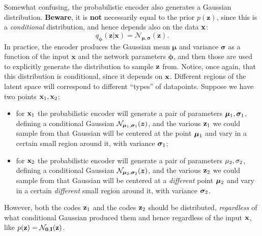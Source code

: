 Somewhat confusing, the probabilistic encoder also generates a Gaussian distribution. \textbf{Beware}, it is \textbf{not} necessarily equal to the prior $p(\mathbf{z})$, since this is a \emph{conditional} distribution, and hence depends also on the data $\vb{x}$:
\begin{equation}\label{eq:small_gauss}
	q_\mathbf{\phi}(\mathbf{z} | \mathbf{x}) = \mathcal{N}_{\mathbf{\mu}, \mathbf{\sigma}}(\mathbf{z}).
\end{equation}
In practice, the encoder produces the Gaussian mean $\mathbf{\mu}$ and variance $\mathbf{\sigma}$ as a function of the input $\mathbf{x}$ and the network parameters $\mathbf{\phi}$, and then those are used to explicitly generate the distribution to sample $\vb{z}$ from. Notice, once again, that this distribution is conditional, since it depends on $\vb{x}$. Different regions of the latent space will correspond to different ``types'' of datapoints. Suppose we have two points $\vb{x}_1, \vb{x}_2$: 
\begin{itemize}
    \item for $\vb{x}_1$ the probabilistic encoder will generate a pair of parameters $\vb*{\mu}_1, \vb*{\sigma}_1$, defining a conditional Gaussian $\mathcal{N}_{\vb*{\mu}_1, \vb*{\sigma}_1}(\vb*{z})$, and the various $\vb{z}_1$ we could sample from that Gaussian will be centered at the point $\vb*{\mu}_1$ and vary in a certain small region around it, with variance $\vb*{\sigma}_1$;
    
    \item for $\vb{x}_2$ the probabilistic encoder will generate a pair of parameters $\vb{\mu}_2, \vb{\sigma}_2$, defining a conditional Gaussian $\mathcal{N}_{\vb*{\mu}_2, \vb*{\sigma}_2}(\vb*{z})$, and the various $\vb{z}_2$ we could sample from that Gaussian will be centered at a \emph{different} point $\vb*{\mu}_2$ and vary in a certain \emph{different} small region around it, with variance $\vb*{\sigma}_2$.
\end{itemize}
 However, both the codes $\vb{z}_1$ and the codes $\vb{z}_2$ should be distributed, \emph{regardless} of what conditional Gaussian produced them and hence regardless of the input $\vb{x}$, like $p(\vb{z}) = \mathcal{N}_{\vb{0}, \vb{I}}(\vb{z})$.

